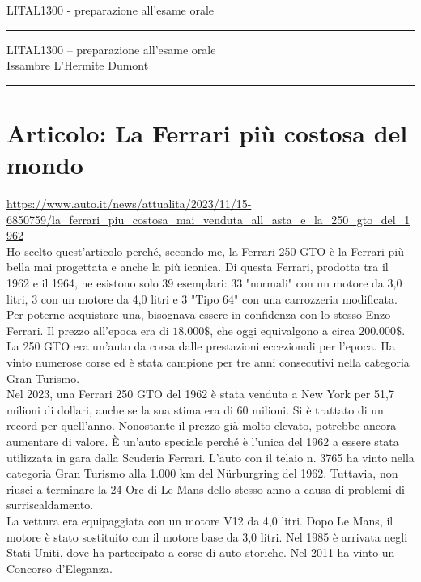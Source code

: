 \documentclass[12pt]{article}
\begin{document}
\noindent LITAL1300 - preparazione all'esame orale\\[-2mm]
\rule{\linewidth}{0.5pt}

\begin{center}
    {\large LITAL1300 -- preparazione all'esame orale} \\
    \bigskip 
    Issambre L'Hermite Dumont \bigskip \\
\end{center}
\hrule
\bigskip

\section*{Articolo: La Ferrari più costosa del mondo}
\url{https://www.auto.it/news/attualita/2023/11/15-6850759/la_ferrari_piu_costosa_mai_venduta_all_asta_e_la_250_gto_del_1962}\\
Ho scelto quest'articolo perché, secondo me, la Ferrari 250 GTO è la Ferrari più bella mai progettata e anche la più iconica. Di questa Ferrari, prodotta tra il 1962 e il 1964, ne esistono solo 39 esemplari: 33 "normali" con un motore da 3,0 litri, 3 con un motore da 4,0 litri e 3 "Tipo 64" con una carrozzeria modificata. Per poterne acquistare una, bisognava essere in confidenza con lo stesso Enzo Ferrari. Il prezzo all’epoca era di $ 18.000\$ $, che oggi equivalgono a circa $ 200.000\$ $.\\
La 250 GTO era un'auto da corsa dalle prestazioni eccezionali per l'epoca. Ha vinto numerose corse ed è stata campione per tre anni consecutivi nella categoria Gran Turismo.\\
Nel 2023, una Ferrari 250 GTO del 1962 è stata venduta a New York per 51,7 milioni di dollari, anche se la sua stima era di 60 milioni. Si è trattato di un record per quell’anno. Nonostante il prezzo già molto elevato, potrebbe ancora aumentare di valore. È un’auto speciale perché è l'unica del 1962 a essere stata utilizzata in gara dalla Scuderia Ferrari. L'auto con il telaio n. 3765 ha vinto nella categoria Gran Turismo alla 1.000 km del Nürburgring del 1962. Tuttavia, non riuscì a terminare la 24 Ore di Le Mans dello stesso anno a causa di problemi di surriscaldamento.\\
La vettura era equipaggiata con un motore V12 da 4,0 litri. Dopo Le Mans, il motore è stato sostituito con il motore base da 3,0 litri. Nel 1985 è arrivata negli Stati Uniti, dove ha partecipato a corse di auto storiche. Nel 2011 ha vinto un Concorso d'Eleganza.\\
\end{document}
